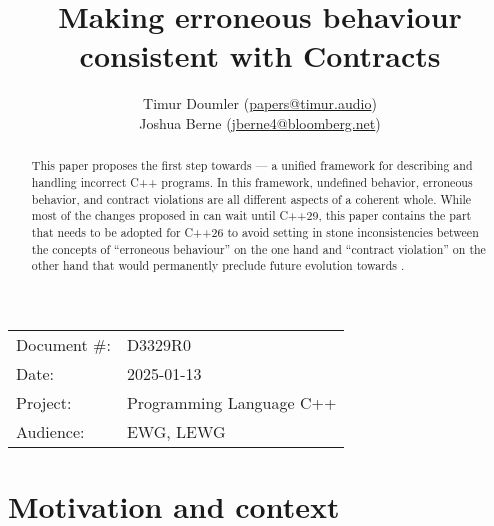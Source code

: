 \title{Making erroneous behaviour consistent with Contracts}
\author{
Timur Doumler \small(\href{mailto:papers@timur.audio}{papers@timur.audio}) \\
Joshua Berne \small(\href{mailto:jberne4@bloomberg.net}{jberne4@bloomberg.net}) \\
}
\date{}
\maketitle

\begin{tabular}{ll}
Document \#: & D3329R0 \\
Date: &2025-01-13 \\
Project: & Programming Language C++ \\
Audience: & EWG, LEWG
\end{tabular}

\begin{abstract}
This paper proposes the first step towards \cite{P3100R1} --- a unified framework for describing and handling incorrect C++ programs. In this framework, undefined behavior, erroneous behavior, and contract violations are all different aspects of a coherent whole. While most of the changes proposed in \cite{P3100R1} can wait until C++29, this paper contains the part that needs to be adopted for C++26 to avoid setting in stone inconsistencies between the concepts of ``erroneous behaviour'' on the one hand and ``contract violation'' on the other hand that would permanently preclude future evolution towards \cite{P3100R1}.
\end{abstract}








\section{Motivation and context}
\label{motivation}

